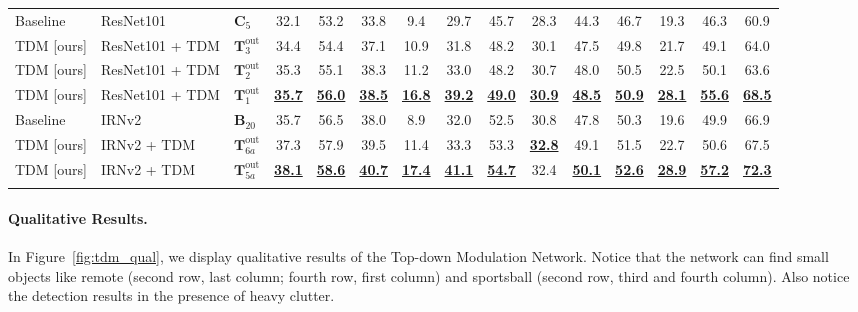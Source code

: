 \documentclass[10pt,twocolumn,letterpaper]{article}
\newcommand{\hl}[1]{\underline{\textbf{#1}}}
\begin{document}
\begin{table*}[t]
{\begin{tabular}{
@{}L{2.2cm} L{2.5cm} o{2.4cm}
!{\color{gray}\vrule} ccc
!{\color{gray}\vrule} ccc
!{\color{gray}\vrule} ccc
!{\color{gray}\vrule} ccc
@{}}
Baseline & ResNet101 &  $\mathbf{C}_5$ & 32.1 & 53.2 & 33.8 & 9.4 & 29.7 & 45.7 & 28.3 & 44.3 & 46.7 & 19.3 & 46.3 & 60.9 \\
TDM [ours] & ResNet101 + TDM & $\mathbf{T}^\text{out}_{3}$ & 34.4 & 54.4 & 37.1 & 10.9 & 31.8 & 48.2 & 30.1 & 47.5 & 49.8 & 21.7 & 49.1 & 64.0 \\
TDM [ours] & ResNet101 + TDM & $\mathbf{T}^\text{out}_{2}$ & 35.3 & 55.1 & 38.3 & 11.2 & 33.0 & 48.2 & 30.7 & 48.0 & 50.5 & 22.5 & 50.1 & 63.6 \\
TDM [ours] & ResNet101 + TDM & $\mathbf{T}^\text{out}_{1}$ & \hl{35.7} & \hl{56.0} & \hl{38.5} & \hl{16.8} & \hl{39.2} & \hl{49.0} & \hl{30.9} & \hl{48.5} & \hl{50.9} & \hl{28.1} & \hl{55.6} & \hl{68.5} \\
\Xhline{1pt}
Baseline & IRNv2 & $\mathbf{B}_{20}$ & 35.7 & 56.5 & 38.0 & 8.9 & 32.0 & 52.5 & 30.8 & 47.8 & 50.3 & 19.6 & 49.9 & 66.9 \\
TDM [ours] & IRNv2 + TDM & $\mathbf{T}^\text{out}_{6a}$ & 37.3 & 57.9 & 39.5 & 11.4 & 33.3 & 53.3 & \hl{32.8} & 49.1 & 51.5 & 22.7 & 50.6 & 67.5 \\
TDM [ours] & IRNv2 + TDM & $\mathbf{T}^\text{out}_{5a}$ & \hl{38.1} & \hl{58.6} & \hl{40.7} & \hl{17.4} & \hl{41.1} & \hl{54.7} & 32.4 & \hl{50.1} & \hl{52.6} & \hl{28.9} & \hl{57.2} & \hl{72.3} \\
\Xhline{1pt}
\end{tabular}
}
\vspace{-0.1in}
\label{tab:coco_minival}
\end{table*}



\paragraph{Qualitative Results.}
In Figure~\ref{fig:tdm_qual}, we display qualitative results of the Top-down Modulation Network. Notice that the network can find small objects like remote (second row, last column; fourth row, first column) and sportsball (second row, third and fourth column). Also notice the detection results in the presence of heavy clutter.
\end{document}
